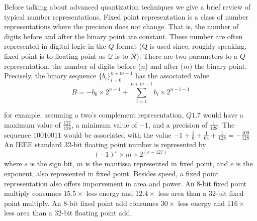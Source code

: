 Before talking about advanced quantization techniques we give a brief review of typical number representations.  Fixed point representation is a class of number representations where the precision does not change.  That is, the number of digits before and after the binary point are constant.  These number are often represented in digital logic in the $Q$ format (Q is used since, roughly speaking, fixed point is to floating point as $\mathcal{Q}$ is to $\mathcal{R}$).  There are two parameters to a $Q$ representation, the number of digits before ($n$) and after ($m$) the binary point.  Precisely, the binary sequence $\{b_i\}_{i=0}^{n+m-1}$ has the associated value
$$ B = - b_0\times 2^{n-1} + \sum_{i=1}^{n+m-1} b_i \times 2^{n-i-1}$$

for example, assuming a two's complement representation, $Q1.7$ would have a maximum value of $\frac{127}{128}$, a minimum value of $-1$, and a precision of $\frac{1}{128}$.  The sequence $10010011$ would be associated with the value $-1 + \frac{1}{8} + \frac{1}{64} + \frac{1}{128} = -\frac{109}{128}$ 
An IEEE standard 32-bit floating point number is represented by 
$$ (-1)^s \times m \times 2^{(e-127)}$$
where $s$ is the sign bit, $m$ is the mantissa represented in fixed point, and $e$ is the exponent, also represented in fixed point.  Besides speed, a fixed point representation also offers imporvement in area and power.  An 8-bit fixed point multiply consumes $15.5 \times$ less energy and $12.4\times$ less area than a 32-bit fixed point multiply.  An 8-bit fixed point add consumes $30\times$ less energy and $116\times$ less area than a 32-bit floating point add. ~\cite{Horowitz}
